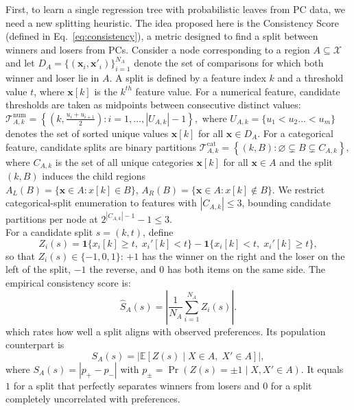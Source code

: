 \documentclass{article}
\begin{document}
First, to learn a single regression tree with probabilistic leaves from PC data, we need a new splitting heuristic.
The idea proposed here is the Consistency Score (defined in Eq.~\ref{eq:consistency}), a metric designed to find a split between winners and losers from PCs.
Consider a node corresponding to a region $A \subseteq \mathcal{X}$ and let $D_A = \{(\mathbf{x}_i, \mathbf{x}'_i)\}_{i=1}^{N_A}$ denote the set of comparisons for which both winner and loser lie in $A$. A split is defined by a feature index $k$ and a threshold value $t$, where $\mathbf{x}[k]$ is the $k^{th}$ feature value. For a numerical feature, candidate thresholds are taken as midpoints between consecutive distinct values: $\mathcal{T}_{A,k}^{\mathrm{num}}
=
\left\{
\left(k,\tfrac{u_i+u_{i+1}}{2}\right)
:
i=1,\dots,|U_{A,k}|-1
\right\},$ where $U_{A,k} = \{u_1 < u_2 ... < u_m\}$ denotes the set of sorted unique values $\mathbf{x}[k]$ for all $\mathbf{x} \in D_A$.
For a categorical feature, candidate splits are binary partitions 
$\mathcal{T}_{A,k}^{\mathrm{cat}}
=
\left\{
(k,B):
\varnothing \subsetneq B \subsetneq C_{A,k}
\right\},
$
where $C_{A,k}$ is the set of all unique categories $\mathbf{x}[k]$ for all $\mathbf{x} \in A$ and the split \((k,B)\) induces the child regions
$
A_L(B)=\{\mathbf{x}\in A:x[k]\in B\},
\,
A_R(B)=\{\mathbf{x}\in A:x[k]\notin B\}.$
We restrict categorical-split enumeration to features with $|C_{A,k}| \le 3$, bounding candidate partitions per node at $2^{|C_{A,k}|-1} - 1 \le 3$.\\
For a candidate split $s=(k,t)$, define
\begin{equation}\label{eq:Zi_def}
Z_i(s)
=
\mathbf{1}\{x_i[k]\ge t,\;x_i'[k]<t\}
-
\mathbf{1}\{x_i[k]<t,\;x_i'[k]\ge t\},
\end{equation}
so that $Z_i(s)\in\{-1,0,1\}$: $+1$ has the winner on the right and the loser on the left of the split, $-1$ the reverse, and $0$ has both items on the same side.
The empirical consistency score is:
\begin{equation}\label{eq:consistency}
\widehat S_A(s)
=
\left|
\frac{1}{N_A}
\sum_{i=1}^{N_A} Z_i(s)
\right|.
\end{equation}
which rates how well a split aligns with observed preferences. Its population counterpart is
\begin{equation}\label{eq:population_score}
S_A(s)
=
\left|
\mathbb{E}\!\left[
Z(s)\mid X\in A,\;X'\in A
\right]
\right|,
\end{equation}
where $S_A(s) = |p_+ - p_-|$ with $p_\pm = \Pr(Z(s) = \pm 1 \mid X, X' \in A)$.
It equals $1$ for a split that perfectly separates winners from losers and $0$ for a split completely uncorrelated with preferences.
\end{document}
